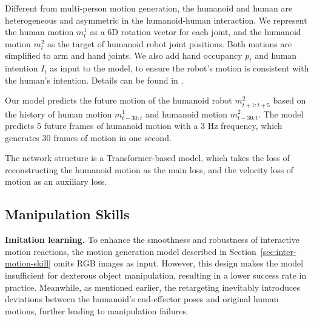 Different from multi-person motion generation, the humanoid and human are heterogeneous and asymmetric in the humanoid-human interaction.
We represent the human motion $m^1_t$ as a 6D rotation vector for each joint, and the humanoid motion $m^2_t$ as the target of humanoid robot joint positions. Both motions are simplified to arm and hand joints. We also add hand occupancy $p_t$ and human intention $I_t$ as input to the model, to ensure the robot's motion is consistent with the human's intention. Details can be found in .

Our model predicts the future motion of the humanoid robot $m^2_{t+1:t+5}$ based on the history of human motion $m^1_{t-30:t}$ and humanoid motion $m^2_{t-30:t}$.
The model predicts 5 future frames of humanoid motion with a 3 Hz frequency, which generates 30 frames of motion in one second.

The network structure is a Transformer-based model, which takes the loss of reconstructing the humanoid motion as the main loss, and the velocity loss of motion as an auxiliary loss.

\subsection{Manipulation Skills}
\noindent\textbf{Imitation learning.}
To enhance the smoothness and robustness of interactive motion reactions, the motion generation model described in Section~\ref{sec:inter-motion-skill} omits RGB images as input. However, this design makes the model insufficient for dexterous object manipulation, resulting in a lower success rate in practice. 
Meanwhile, as mentioned earlier, the retargeting inevitably introduces deviations between the humanoid’s end-effector poses and original human motions, further leading to manipulation failures.

